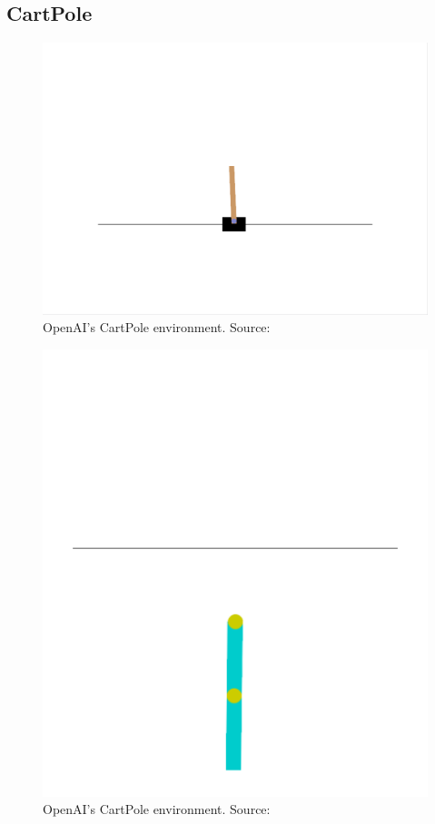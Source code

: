 \documentclass{article}
\begin{document}
\subsection{CartPole}
\label{ssec:cp}
\begin{figure}[htbp]
    \centering
    \includegraphics[width=0.9\linewidth]{figs/cartpole.png}
    \caption{
        OpenAI's CartPole environment. 
        Source: \cite{gymlibraryCartPole}
    }
    \label{fig:cartpole}
\end{figure}

\begin{figure}[htbp]
    \centering
    \includegraphics[width=0.9\linewidth]{figs/acrobot.png}
    \caption{
        OpenAI's CartPole environment. 
        Source: \cite{gymlibraryAcrobot}
    }
    \label{fig:cartpole}
\end{figure}
\end{document}
